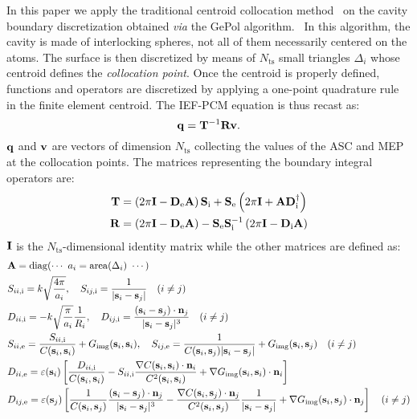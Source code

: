 In this paper we apply the traditional centroid collocation
method~\autocite{Tomasi2005-vm, Pomelli2007-wq} on the cavity boundary
discretization obtained \emph{via} the GePol
algorithm.~\autocite{Pascual-Ahuir1987-uo, Pascual-Ahuir1990-lp,
Pomelli1998-qp, Pomelli2001-sj, Frediani2004-ua, Pomelli2007-wq}
In this algorithm, the cavity is made of interlocking spheres, not all
of them necessarily centered on the atoms. The surface is then
discretized by means of $N_\mathrm{ts}$ small triangles $\Delta_i$ whose
centroid defines the \emph{collocation point}. Once the centroid is
properly defined, functions and operators are discretized by applying a
one-point quadrature rule in the finite element centroid.
The \acs{IEF}-\acs{PCM} equation is thus recast as:
\begin{equation}
  \mathbf{q}
  =
  \mathbf{T}^{-1}\mathbf{R}\mathbf{v}.
\end{equation}
$\mathbf{q}$ and $\mathbf{v}$ are vectors of dimension $N_\mathrm{ts}$
collecting the values of the \acs{ASC} and \ac{MEP}
at the collocation points.
The matrices representing the boundary integral operators are:
\begin{align}
  \mathbf{T} &=
  \left(2\pi\mathbf{I} - \mathbf{D}_\mathrm{e}\mathbf{A}\right)\mathbf{S}_\mathrm{i}
  +\mathbf{S}_\mathrm{e}\left(2\pi\mathbf{I} +
  \mathbf{A}\mathbf{D}_\mathrm{i}^\dagger\right) \\
  \mathbf{R} &=
  \left(2\pi\mathbf{I} - \mathbf{D}_\mathrm{e}\mathbf{A}\right) -
  \mathbf{S}_\mathrm{e}\mathbf{S}^{-1}_\mathrm{i}\left(2\pi\mathbf{I}-\mathbf{D}_\mathrm{i}\mathbf{A}\right)
\end{align}
$\mathbf{I}$ is the $N_\mathrm{ts}$-dimensional identity matrix while the
other matrices are defined as:
\begin{alignat}{2}
  &\mathbf{A} = \mathrm{diag}(\cdots\,\, a_i = \mathrm{area}(\Delta_i)\,\, \cdots) \\
  &S_{ii, \mathrm{i}} = k\sqrt{\frac{4\pi}{a_i}}, \quad
  S_{ij, \mathrm{i}} = \frac{1}{|\mathbf{s}_i-\mathbf{s}_j|}\quad (i \neq j) \\
  &D_{ii, \mathrm{i}} = -k\sqrt{\frac{\pi}{a_i}}\frac{1}{R_i}, \quad
  D_{ij, \mathrm{i}} =
  \frac{(\mathbf{s}_i-\mathbf{s}_j)\cdot\mathbf{n}_j}{|\mathbf{s}_i-\mathbf{s}_j|^3}\quad (i \neq j) \\
  &S_{ii, \mathrm{e}} = \frac{S_{ii, \mathrm{i}}}{C(\mathbf{s}_i, \mathbf{s}_i)} +
        G_\mathrm{img}(\mathbf{s}_i, \mathbf{s}_i), \quad
  S_{ij, \mathrm{e}} =
  \frac{1}{C(\mathbf{s}_i, \mathbf{s}_j)|\mathbf{s}_i-\mathbf{s}_j|} +
  G_\mathrm{img}(\mathbf{s}_i, \mathbf{s}_j) \quad (i \neq j) \\
  &D_{ii, \mathrm{e}} = \varepsilon(\mathbf{s}_i)\left[
  \frac{D_{ii, \mathrm{i}}}{C(\mathbf{s}_i, \mathbf{s}_i)}
  -S_{ii, \mathrm{i}}
  \frac{\nabla C(\mathbf{s}_i,
  \mathbf{s}_i)\cdot\mathbf{n}_i}{C^2(\mathbf{s}_i, \mathbf{s}_i)}
  +
  \nabla G_\mathrm{img}(\mathbf{s}_i, \mathbf{s}_i)\cdot\mathbf{n}_i
  \right] \\
  &D_{ij, \mathrm{e}} =
  \varepsilon(\mathbf{s}_j)\left[
  \frac{1}{C(\mathbf{s}_i, \mathbf{s}_j)}
  \frac{(\mathbf{s}_i-\mathbf{s}_j)\cdot\mathbf{n}_j}{|\mathbf{s}_i-\mathbf{s}_j|^3}
  -\frac{\nabla C(\mathbf{s}_i,
  \mathbf{s}_j)\cdot\mathbf{n}_j}{C^2(\mathbf{s}_i, \mathbf{s}_j)}
  \frac{1}{|\mathbf{s}_i-\mathbf{s}_j|}
  + \nabla G_\mathrm{img}(\mathbf{s}_i, \mathbf{s}_j)\cdot\mathbf{n}_j
  \right]\quad (i \neq j)
\end{alignat}
